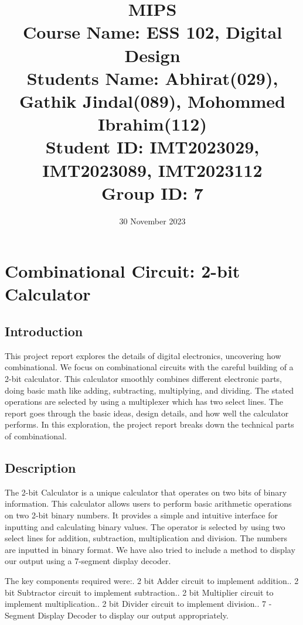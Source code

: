 \documentclass[a4paper,10pt]{article}
\title{\Large\textbf{MIPS} \\
    \normalsize Course Name: ESS 102, Digital Design \\ %

    \normalsize Students Name: Abhirat(029), Gathik Jindal(089), Mohommed Ibrahim(112)\\ %
    \normalsize Student ID: IMT2023029, IMT2023089, IMT2023112\\ %
    \normalsize Group ID: 7 \\%
    }
\date{30 November 2023} %
\begin{document}
\maketitle
\thispagestyle{fancy} 

\section{Combinational Circuit: 2-bit Calculator}

\subsection{Introduction}
This project report explores the details of digital electronics, uncovering how combinational. We focus on combinational circuits with the careful building of a 2-bit calculator. This calculator smoothly combines different electronic parts, doing basic math like adding, subtracting, multiplying, and dividing. The stated operations are selected by using a multiplexer which has two select lines. The report goes through the basic ideas, design details, and how well the calculator performs. In this exploration, the project report breaks down the technical parts of combinational.

\subsection{Description}
The 2-bit Calculator is a unique calculator that operates on two bits of binary information. This calculator allows users to perform basic arithmetic operations on two 2-bit binary numbers. It provides a simple and intuitive interface for inputting and calculating binary values. The operator is selected by using two select lines for addition, subtraction, multiplication and division. The numbers are inputted in binary format. We have also tried to include a method to display our output using a 7-segment display decoder.

The key components required were:. 2 bit Adder circuit to implement addition.. 2 bit Subtractor circuit to implement subtraction.. 2 bit Multiplier circuit to implement multiplication.. 2 bit Divider circuit to implement division.. 7 - Segment Display Decoder to display our output appropriately.\newline
\end{document}
